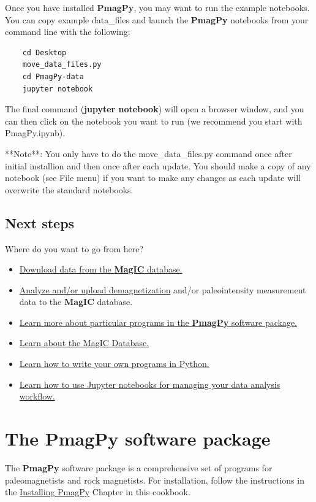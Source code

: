 \documentclass[11pt]{book}
\begin{document}
{Once you have installed {\bf PmagPy}, you may want to run the example notebooks.  You can copy example data\_files and launch the {\bf PmagPy} notebooks from your command line with the following:

\begin{verbatim}
    cd Desktop
    move_data_files.py
    cd PmagPy-data
    jupyter notebook
\end{verbatim}

The final command ({\bf jupyter notebook}) will open a browser window, and you can then click on the notebook you want to run (we recommend you start with PmagPy.ipynb).

**Note**: You only have to do the move\_data\_files.py command once after initial installion and then once after each update.   You should make a copy of any notebook (see File menu) if you want to make any changes as each update will overwrite the standard notebooks.

\section{Next steps}

Where do you want to go from here?

\begin{itemize}
\item \href{#magic_download}{Download data from the {\bf MagIC} database.}
\item \href{#pmag_gui.py}{Analyze and/or upload demagnetization} and/or paleointensity measurement data to the {\bf MagIC} database.
\item \href{#PmagPy}{Learn more about particular programs in the {\bf PmagPy} software package.}
\item \href{#MagICDatabase}{Learn about the MagIC Database.}
\item \href{#Python}{Learn how to write your own programs in Python.}
\item \href{#Notebooks}{Learn how to use Jupyter notebooks for managing your data analysis workflow.}
\end{itemize}



\chapter{The {\bf PmagPy} software package}
\label{chap:PmagPy}

The {\bf PmagPy} software package is a comprehensive set of programs for paleomagnetists and rock magnetists.  For installation,  follow the instructions in the \href{#quick_start}{Installing PmagPy} Chapter in this cookbook. \\

}
\end{document}
